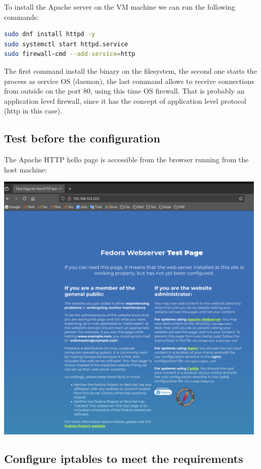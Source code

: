 \documentclass{article}
\begin{document}
To install the Apache server on the VM machine we can run the following commands: 
 
\begin{lstlisting}[language=bash]
sudo dnf install httpd -y
sudo systemctl start httpd.service
sudo firewall-cmd --add-service=http
\end{lstlisting}

The first command install the binary on the filesystem,
the second one starts the process as service OS (daemon),
the last command allows to receive connections from outside
on the port 80, using this time OS firewall.
That is probably an application level firewall, since it
has the concept of application level protocol (http in this case).

\subsection{Test before the configuration}

The Apache HTTP hello page is accessible from the browser
running from the host machine:

\includegraphics[width=13cm]{h8-8}

\subsection{Configure iptables to meet the requirements}
\end{document}
